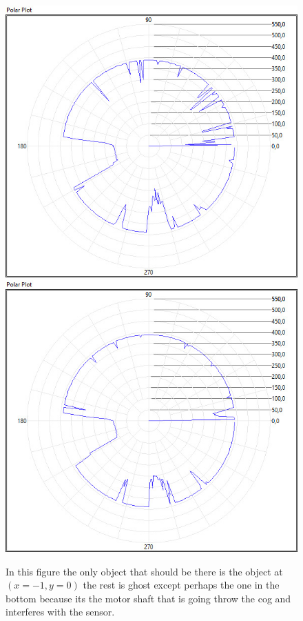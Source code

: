 \begin{figure}[ht]
        \includegraphics[scale=0.2]{./mesurment/data/Lidar_30ms_9_oclock_detection}
        \includegraphics[scale=0.2]{./mesurment/data/Lidar_40ms_9_oclock_detection}
    
  \caption{In this figure the only object that should be there is the object at $(x=-1, y=0)$ the rest is ghost except perhaps the one in the bottom because its the motor shaft that is going throw the cog and interferes with the sensor.}
  \label{fig:lidar-images}
\end{figure}

